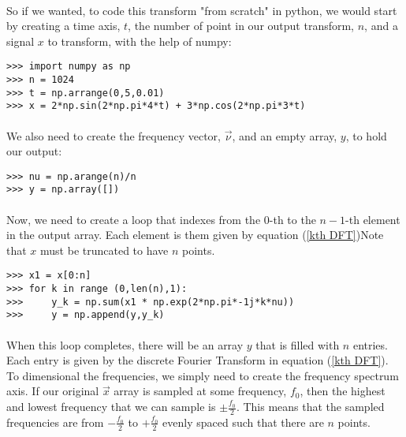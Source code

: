 \documentclass[12pt,letterpaper]{article}
\begin{document}
\paragraph*{}So if we wanted, to code this transform "from scratch" in python, we would start by creating a time axis, $t$, the number of point in our output transform, $n$, and a signal $x$ to transform, with the help of numpy:
\begin{verbatim}
>>> import numpy as np
>>> n = 1024
>>> t = np.arrange(0,5,0.01)
>>> x = 2*np.sin(2*np.pi*4*t) + 3*np.cos(2*np.pi*3*t)

\end{verbatim}
\paragraph*{}We also need to create the frequency vector, $\vec{\nu}$, and an empty array, $y$, to hold our output:
\begin{verbatim}
>>> nu = np.arange(n)/n
>>> y = np.array([])
\end{verbatim}
\paragraph*{}Now, we need to create a loop that indexes from the $0$-th to the $n-1$-th element in the output array. Each element is them given by equation (\ref{kth DFT})Note that $x$ must be truncated to have $n$ points.
\begin{verbatim}
>>> x1 = x[0:n]
>>> for k in range (0,len(n),1):
>>>     y_k = np.sum(x1 * np.exp(2*np.pi*-1j*k*nu))
>>>     y = np.append(y,y_k)  
\end{verbatim}
\paragraph*{}When this loop completes, there will be an array $y$ that is filled with $n$ entries. Each entry is given by the discrete Fourier Transform in equation (\ref{kth DFT}). To dimensional the frequencies, we simply need to create the frequency spectrum axis. If our original $\vec{x}$ array is sampled at some frequency, $f_0$, then the highest and lowest frequency that we can sample is $\pm\frac{f_0}{2}$. This means that the sampled frequencies are from $-\frac{f_0}{2}$ to $+\frac{f_0}{2}$ evenly spaced such that there are $n$ points.

\end{document}
